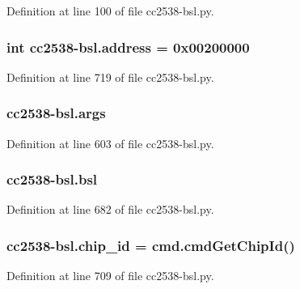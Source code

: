 Definition at line 100 of file cc2538-\/bsl.\+py.

\subsubsection[{\texorpdfstring{address}{address}}]{\setlength{\rightskip}{0pt plus 5cm}int cc2538-\/bsl.\+address = 0x00200000}\hypertarget{namespacecc2538-bsl_ae601873d3bde248e312fdf16e2d5d01c}{}\label{namespacecc2538-bsl_ae601873d3bde248e312fdf16e2d5d01c}


Definition at line 719 of file cc2538-\/bsl.\+py.

\subsubsection[{\texorpdfstring{args}{args}}]{\setlength{\rightskip}{0pt plus 5cm}cc2538-\/bsl.\+args}\hypertarget{namespacecc2538-bsl_a8457539981eaac04c795a5924638db10}{}\label{namespacecc2538-bsl_a8457539981eaac04c795a5924638db10}


Definition at line 603 of file cc2538-\/bsl.\+py.

\subsubsection[{\texorpdfstring{bsl}{bsl}}]{\setlength{\rightskip}{0pt plus 5cm}cc2538-\/bsl.\+bsl}\hypertarget{namespacecc2538-bsl_ac16fd91d8739889650b3a1f5e9830137}{}\label{namespacecc2538-bsl_ac16fd91d8739889650b3a1f5e9830137}


Definition at line 682 of file cc2538-\/bsl.\+py.

\subsubsection[{\texorpdfstring{chip\+\_\+id}{chip_id}}]{\setlength{\rightskip}{0pt plus 5cm}cc2538-\/bsl.\+chip\+\_\+id = cmd.\+cmd\+Get\+Chip\+Id()}\hypertarget{namespacecc2538-bsl_a7e101497379303ffcc6d03455e933c88}{}\label{namespacecc2538-bsl_a7e101497379303ffcc6d03455e933c88}


Definition at line 709 of file cc2538-\/bsl.\+py.

